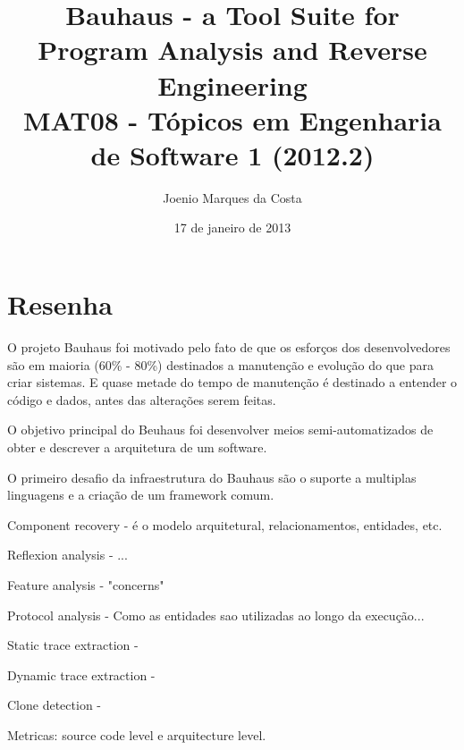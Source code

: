 \documentclass[12pt]{article}
\title{Bauhaus - a Tool Suite for Program Analysis and Reverse Engineering
 \cite{Bauhaus} \\
 \large MAT08 - Tópicos em Engenharia de Software 1 (2012.2)}
\author{Joenio Marques da Costa}
\date{17 de janeiro de 2013}
\begin{document}
\maketitle

\section*{Resenha}

O projeto Bauhaus foi motivado pelo fato de que os esforços dos desenvolvedores
são em maioria (60\% - 80\%) destinados a manutenção e evolução do que para criar
sistemas. E quase metade do tempo de manutenção é destinado a entender o código
e dados, antes das alterações serem feitas.

O objetivo principal do Beuhaus foi desenvolver meios semi-automatizados de
obter e descrever a arquitetura de um software.

O primeiro desafio da infraestrutura do Bauhaus são o suporte a multiplas linguagens
e a criação de um framework comum.

Component recovery - é o modelo arquitetural, relacionamentos, entidades, etc.

Reflexion analysis - ...

Feature analysis - "concerns"

Protocol analysis - Como as entidades sao utilizadas ao longo da execução...

Static trace extraction - 

Dynamic trace extraction - 

Clone detection - 

Metricas: source code level e arquitecture level.





\end{document}
